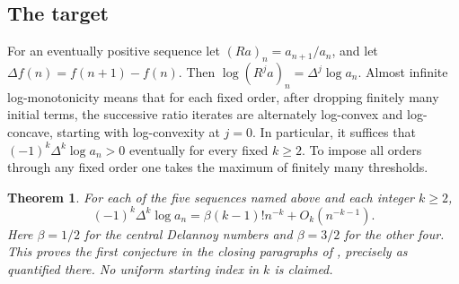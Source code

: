\documentclass[11pt,a4paper]{article}
\numberwithin{equation}{section}
\newtheorem{theorem}{Theorem}[section]
\theoremstyle{definition}
\theoremstyle{remark}
\begin{document}
\subsection{The target}
For an eventually positive sequence let $(Ra)_n=a_{n+1}/a_n$, and let $\Delta f(n)=f(n+1)-f(n)$. Then $\log (R^j a)_n=\Delta^j\log a_n$. Almost infinite log-monotonicity means that for each fixed order, after dropping finitely many initial terms, the successive ratio iterates are alternately log-convex and log-concave, starting with log-convexity at $j=0$. In particular, it suffices that $(-1)^k\Delta^k\log a_n>0$ eventually for every fixed $k\ge2$. To impose all orders through any fixed order one takes the maximum of finitely many thresholds.
\begin{theorem}
For each of the five sequences named above and each integer $k\ge2$,
\[
 (-1)^k\Delta^k\log a_n=\beta(k-1)!n^{-k}+O_k(n^{-k-1}).
\]
Here $\beta=1/2$ for the central Delannoy numbers and $\beta=3/2$ for the other four. This proves the first conjecture in the closing paragraphs of \cite{r27reiwa:CGW}, precisely as quantified there. No uniform starting index in $k$ is claimed.
\end{theorem}
\end{document}
